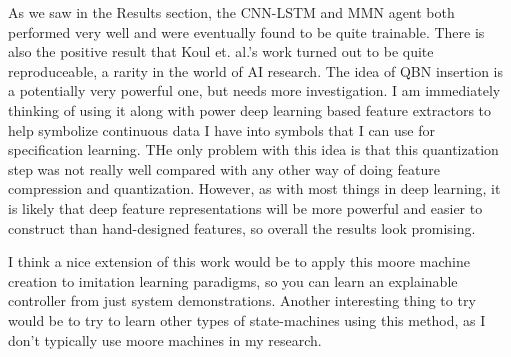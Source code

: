 As we saw in the Results section, the CNN-LSTM and MMN agent both performed very well and were eventually found to be quite trainable. There is also the positive result that Koul et. al.'s work turned out to be quite reproduceable, a rarity in the world of AI research. The idea of QBN insertion is a potentially very powerful one, but needs more investigation. I am immediately thinking of using it along with power deep learning based feature extractors to help symbolize continuous data I have into symbols that I can use for specification learning. THe only problem with this idea is that this quantization step was not really well compared with any other way of doing feature compression and quantization. However, as with most things in deep learning, it is likely that deep feature representations will be more powerful and easier to construct than hand-designed features, so overall the results look promising. 

I think a nice extension of this work would be to apply this moore machine creation to imitation learning paradigms, so you can learn an explainable controller from just system demonstrations. Another interesting thing to try would be to try to learn other types of state-machines using this method, as I don't typically use moore machines in my research.